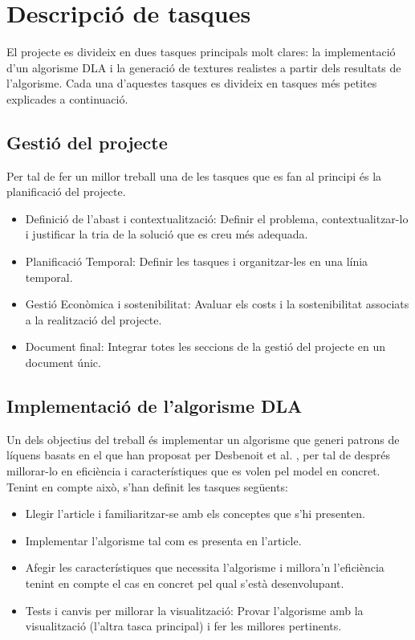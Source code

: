 \documentclass{article}
\begin{document}
\newpage

\section{Descripció de tasques}

El projecte es divideix en dues tasques principals molt clares: la implementació d'un algorisme DLA i la generació de textures realistes a partir dels resultats de l'algorisme. Cada una d'aquestes tasques es divideix en tasques més petites explicades a continuació.

\subsection{Gestió del projecte}

Per tal de fer un millor treball una de les tasques que es fan al principi és la planificació del projecte.

\begin{itemize}
    \item Definició de l’abast i contextualització: Definir el problema, contextualitzar-lo i justificar la tria de la solució que es creu més adequada.
    \item Planificació Temporal: Definir les tasques i organitzar-les en una línia temporal.
    \item Gestió Econòmica i sostenibilitat: Avaluar els costs i la sostenibilitat associats a la realització del projecte.
    \item Document final: Integrar totes les seccions de la gestió del projecte en un document únic.
\end{itemize}

\subsection{Implementació de l'algorisme DLA}

Un dels objectius del treball és implementar un algorisme que generi patrons de líquens basats en el que han proposat per Desbenoit et al. \cite{Simulating-and-modeling-lichen-growth}, per tal de després millorar-lo en eficiència i característiques que es volen pel model en concret. Tenint en compte això, s'han definit les tasques següents:

\begin{itemize}
    \item Llegir l'article i familiaritzar-se amb els conceptes que s'hi presenten.
    \item Implementar l'algorisme tal com es presenta en l'article. 
    \item Afegir les característiques que necessita l'algorisme i millora'n l'eficiència tenint en compte el cas en concret pel qual s'està desenvolupant.
    \item Tests i canvis per millorar la visualització: Provar l'algorisme amb la visualització (l'altra tasca principal) i fer les millores pertinents.
\end{itemize}
\end{document}
